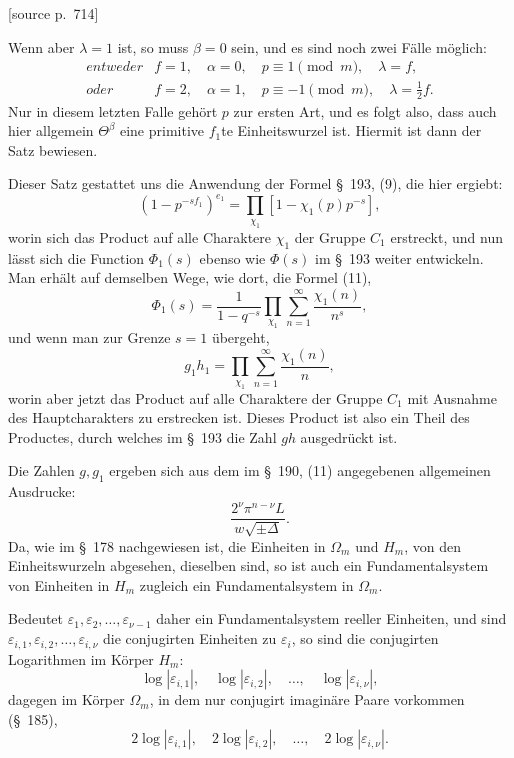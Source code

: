 \documentclass[11pt]{article}
\newcommand{\eps}{\varepsilon}
\newcommand{\srcpage}[1]{\par\medskip\noindent\textsf{[source p.~#1]}\par\smallskip}
\begin{document}
\srcpage{714}
Wenn aber $\lambda=1$ ist, so muss $\beta=0$ sein, und es sind noch zwei Fälle möglich:
\[
\begin{array}{ll}
entweder & f=1,\quad \alpha=0,\quad p\equiv1\pmod m,\quad \lambda=f,\\[2mm]
oder & f=2,\quad \alpha=1,\quad p\equiv-1\pmod m,\quad \lambda=\frac12f.
\end{array}
\]
Nur in diesem letzten Falle gehört $p$ zur ersten Art, und es folgt also, dass auch hier allgemein $\Theta^\beta$ eine primitive $f_1$te Einheitswurzel ist. Hiermit ist dann der Satz bewiesen.

Dieser Satz gestattet uns die Anwendung der Formel \S~193, (9), die hier ergiebt:
\begin{equation}
(1-p^{-sf_1})^{e_1}=\prod_{\chi_1}[1-\chi_1(p)p^{-s}],
\tag{8}
\end{equation}
worin sich das Product auf alle Charaktere $\chi_1$ der Gruppe $C_1$ erstreckt, und nun lässt sich die Function $\Phi_1(s)$ ebenso wie $\Phi(s)$ im \S~193 weiter entwickeln. Man erhält auf demselben Wege, wie dort, die Formel (11),
\begin{equation}
\Phi_1(s)=\frac1{1-q^{-s}}\prod_{\chi_1}\sum_{n=1}^{\infty}\frac{\chi_1(n)}{n^s},
\tag{9}
\end{equation}
und wenn man zur Grenze $s=1$ übergeht,
\begin{equation}
g_1h_1=\prod_{\chi_1}\sum_{n=1}^{\infty}\frac{\chi_1(n)}{n},
\tag{10}
\end{equation}
worin aber jetzt das Product auf alle Charaktere der Gruppe $C_1$ mit Ausnahme des Hauptcharakters zu erstrecken ist. Dieses Product ist also ein Theil des Productes, durch welches im \S~193 die Zahl $gh$ ausgedrückt ist.

Die Zahlen $g,g_1$ ergeben sich aus dem im \S~190, (11) angegebenen allgemeinen Ausdrucke:
\begin{equation}
\frac{2^\nu\pi^{n-\nu}L}{w\sqrt{\pm\Delta}}.
\tag{11}
\end{equation}
Da, wie im \S~178 nachgewiesen ist, die Einheiten in $\Omega_m$ und $H_m$, von den Einheitswurzeln abgesehen, dieselben sind, so ist auch ein Fundamentalsystem von Einheiten in $H_m$ zugleich ein Fundamentalsystem in $\Omega_m$.

Bedeutet $\eps_1,\eps_2,\ldots,\eps_{\nu-1}$ daher ein Fundamentalsystem reeller Einheiten, und sind $\eps_{i,1},\eps_{i,2},\ldots,\eps_{i,\nu}$ die conjugirten Einheiten zu $\eps_i$, so sind die conjugirten Logarithmen im Körper $H_m$:
\[
\log|\eps_{i,1}|,\quad\log|\eps_{i,2}|,\quad\ldots,\quad\log|\eps_{i,\nu}|,
\]
dagegen im Körper $\Omega_m$, in dem nur conjugirt imaginäre Paare vorkommen (\S~185),
\[
2\log|\eps_{i,1}|,\quad2\log|\eps_{i,2}|,\quad\ldots,\quad2\log|\eps_{i,\nu}|.
\]
\end{document}
